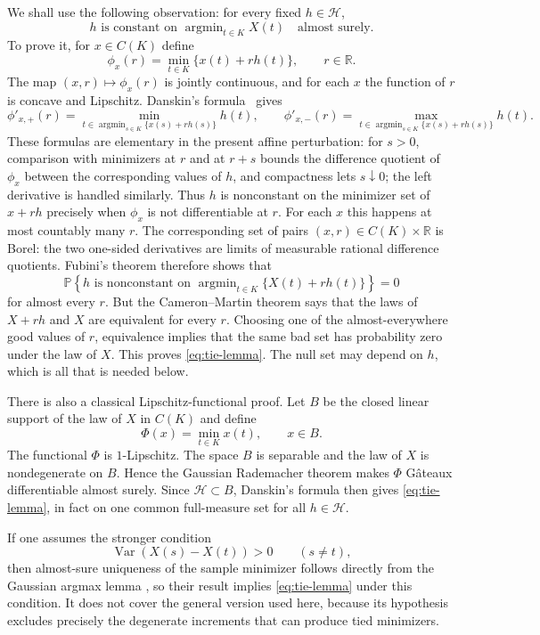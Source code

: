\documentclass[11pt]{amsart}
\theoremstyle{definition}
\theoremstyle{remark}
\DeclareMathOperator*{\Var}{Var}
\DeclareMathOperator*{\argmin}{argmin}
\newcommand{\Pp}{\mathbb P}
\newcommand{\cH}{\mathcal H}
\begin{document}
We shall use the following observation: for every fixed $h\in\cH$,
\begin{equation}
 h \text{ is constant on }\argmin_{t\in K}X(t)
 \quad\text{almost surely}.
 \label{eq:tie-lemma}
\end{equation}
To prove it, for $x\in C(K)$ define
\[
 \phi_x(r)=\min_{t\in K}\{x(t)+r h(t)\},\qquad r\in\mathbb R.
\]
The map $(x,r)\mapsto\phi_x(r)$ is jointly continuous, and for each $x$
the function of $r$ is concave and Lipschitz.  Danskin's
formula~\cite{Danskin1966} gives
\[
 \phi'_{x,+}(r)
 =\min_{t\in\argmin_{s\in K}\{x(s)+rh(s)\}}h(t),
 \qquad
 \phi'_{x,-}(r)
 =\max_{t\in\argmin_{s\in K}\{x(s)+rh(s)\}}h(t).
\]
These formulas are elementary in the present affine perturbation: for
$s>0$, comparison with minimizers at $r$ and at $r+s$ bounds the
difference quotient of $\phi_x$ between the corresponding values of
$h$, and compactness lets $s\downarrow0$; the left derivative is handled
similarly.
Thus $h$ is nonconstant on the minimizer set of $x+rh$ precisely when
$\phi_x$ is not differentiable at $r$.  For each $x$ this happens at
most countably many $r$.  The corresponding set of pairs
$(x,r)\in C(K)\times\mathbb R$ is Borel: the two one-sided derivatives are limits
of measurable rational difference quotients.  Fubini's theorem therefore
shows that
\[
 \Pp\left\{h\text{ is nonconstant on }
 \argmin_{t\in K}\{X(t)+rh(t)\}\right\}=0
\]
for almost every $r$.  But the Cameron--Martin theorem says that the laws
of $X+rh$ and $X$ are equivalent for every $r$.  Choosing one of the
almost-everywhere good values of $r$, equivalence implies that the same
bad set has probability zero under the law of $X$.  This proves
\eqref{eq:tie-lemma}.  The null set may depend on $h$, which is all that
is needed below.

There is also a classical Lipschitz-functional proof.  Let $B$ be the
closed linear support of the law of $X$ in $C(K)$ and define
\[
 \Phi(x)=\min_{t\in K}x(t),\qquad x\in B.
\]
The functional $\Phi$ is $1$-Lipschitz.  The space $B$ is separable and
the law of $X$ is nondegenerate on $B$.  Hence the Gaussian Rademacher
theorem  \cite[Theorem~6]{Phelps1978} makes $\Phi$
G\^ateaux differentiable almost surely.  Since $\cH\subset B$, Danskin's
formula then gives \eqref{eq:tie-lemma}, in fact on one common
full-measure set for all $h\in\cH$.

If one assumes the stronger condition
\[
 \Var(X(s)-X(t))>0 \qquad(s\ne t),
\]
then almost-sure uniqueness of the sample minimizer follows directly from
the Gaussian argmax lemma  \cite[Lemma 2.6]{KimPollard1990},
so their result implies \eqref{eq:tie-lemma} under this condition.  It
does not cover the general version used here, because its hypothesis
excludes precisely the degenerate increments that can produce tied
minimizers.
\end{document}
